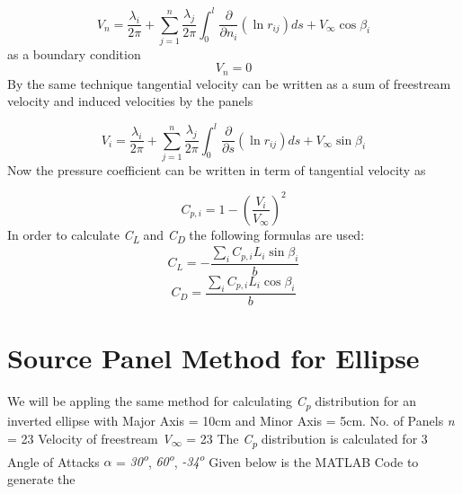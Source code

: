 \documentclass[a4paper]{article}
\begin{document}
\begin{equation*}
V_n = \frac{\lambda_i}{2\pi} +  \sum_{j=1}^{n} \frac{\lambda_j}{2 \pi} \int_0^l \frac{\partial }{\partial n_i}(\ln r_{ij}) ds + V_\infty\cos\beta_i
\end{equation*}
\newline
as a boundary condition 
\begin{equation*}
V_n = 0
\end{equation*}
\pagebreak
\newline
By the same technique tangential velocity can be written as a sum of freestream velocity and induced velocities by the panels

\begin{equation*}
V_i = \frac{\lambda_i}{2\pi} +  \sum_{j=1}^{n} \frac{\lambda_j}{2 \pi} \int_0^l \frac{\partial }{\partial s}(\ln r_{ij}) ds + V_\infty\sin\beta_i
\end{equation*}
\newline
Now the pressure coefficient can be written in term of tangential velocity as 

\begin{equation*}
C_{p,i} = 1 - \left(\frac{V_i}{V_\infty}\right)^2
\end{equation*}
\newline
In order to calculate \textit{C\textsubscript{L}} and \textit{C\textsubscript{D}} the following formulas are used:
\begin{equation*}
C_L = - \frac{\sum_{i} C_{p,i}L_i\sin\beta_i}{b}
\end{equation*}
\begin{equation*}
C_D = \frac{\sum_{i} C_{p,i}L_i\cos\beta_i}{b}
\end{equation*}
\section{Source Panel Method for Ellipse}
\label{sec:example}

We will be appling the same method for calculating \textit{C\textsubscript{p}} distribution for an inverted ellipse with Major Axis = 10cm and Minor Axis = 5cm.
\newline
No. of Panels \textit{n} = 23
\newline
Velocity of freestream \textit{V\textsubscript{$\infty$}} = 23
\newline
The \textit{C\textsubscript{p}} distribution is calculated for 3 Angle of Attacks $\alpha$ = \textit{30\textsuperscript{o}}, \textit{60\textsuperscript{o}}, \textit{-34\textsuperscript{o}}
\newline
Given below is the MATLAB Code to generate the 
\end{document}
